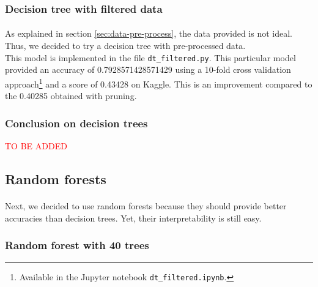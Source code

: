 \documentclass[a4paper, 11pt, oneside]{article}
\begin{document}
\subsubsection{Decision tree with filtered data} \label{subsubsec:dtFiltered}
\paragraph{}As explained in section \ref{sec:data-pre-process}, the data provided is not ideal. Thus, we decided to try a decision tree with pre-processed data.\\
This model is implemented in the file \texttt{dt\_filtered.py}. This particular model provided an accuracy of 0.7928571428571429 using a 10-fold cross validation approach\footnote{Available in the Jupyter notebook \texttt{dt\_filtered.ipynb}.} and a score of 0.43428 on Kaggle. This is an improvement compared to the 0.40285 obtained with pruning.

\subsubsection{Conclusion on decision trees}
\textcolor{red}{TO BE ADDED}


\subsection{Random forests}
\paragraph{}Next, we decided to use random forests because they should provide better accuracies than decision trees. Yet, their interpretability is still easy.

\subsubsection{Random forest with 40 trees} \label{subsubsec:rf40Trees}
\end{document}
